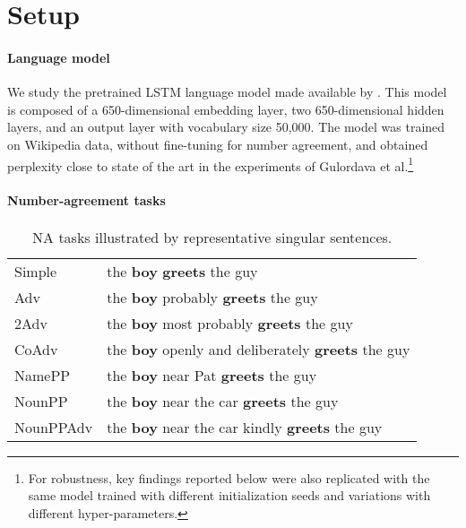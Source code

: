 \section{Setup}\label{sec:the_data}

\paragraph{Language model}\label{ssec:lstm_lm}
We study the pretrained LSTM language model made available by
. This model is composed of a
650-dimensional embedding layer, two 650-dimensional hidden layers,
and an output layer with vocabulary size 50,000.
The model was trained on Wikipedia data, without fine-tuning for number
agreement, and obtained perplexity close to state of the art in the experiments of Gulordava et al.\footnote{For robustness, key findings reported below were also replicated with the same model trained with different initialization seeds and variations with different hyper-parameters.} 


\paragraph{Number-agreement tasks}
\begin{table}[tb]
  \centering
  \begin{footnotesize}
  \begin{tabular}{l@{\hskip1pt}l}
    \B Simple & the \textbf{boy} \textbf{greets} the guy\\
    \B Adv & the \textbf{boy} probably \textbf{greets} the guy\\
    \B 2Adv & the \textbf{boy} most probably \textbf{greets} the guy\\
    \B CoAdv &  the \textbf{boy} openly and deliberately \textbf{greets} the guy\\
    \B NamePP & the \textbf{boy} near Pat \textbf{greets} the guy\\
    \B NounPP & the \textbf{boy} near the car \textbf{greets} the guy\\
    \B NounPPAdv & the \textbf{boy} near the car kindly \textbf{greets} the guy\\
  \end{tabular}
  \end{footnotesize}
  \caption{NA tasks illustrated by representative
    singular sentences.}
  \label{tab:data-sets}
\end{table}

